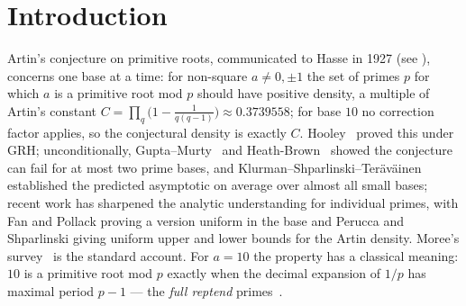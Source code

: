 \begin{abstract}
	Finally we \emph{audit the computational content} of these correlations. In a resubstitution diagnostic the consecutive-prime correlation carries $0.000009$ nats
	($1.3\times10^{-5}$ bits) of conditional-entropy reduction beyond the elementary
	joint-residue baseline, which itself carries $0.4195$ nats; both held-out comparisons are negative, bounding any usable edge at order
	$10^{-6}$ nats.
Both exclusion laws are computationally redundant: the gap law from quadratic reciprocity
	together with multiplicativity, the same-prime law from multiplicativity alone. The one genuinely usable filter --- a primitive root must be a
quadratic non-residue --- is elementary, is exactly what the observed conductor-$40$
channel expresses, and halves the factorizations of $p-1$ in a scanning search; ordering
	the small prime channels of $p-1$ before the full factorization is about $13\%$ faster
	again.
We conclude that these correlations describe arithmetic structure rather than supply
algorithms, and we state precisely what would have to change for that verdict to change.
\end{abstract}

\maketitle

\section{Introduction}
\label{sec:intro}

Artin's conjecture on primitive roots, communicated to Hasse in 1927 (see
\cite{Artin1965}), concerns one base at a time: for non-square
$a \ne 0, \pm 1$ the set of primes $p$ for which $a$ is a primitive root mod $p$
should have positive density, a multiple of Artin's constant
$C = \prod_q \bigl(1 - \tfrac{1}{q(q-1)}\bigr) \approx 0.3739558$; for base $10$ no
correction factor applies, so the conjectural density is exactly $C$. Hooley~\cite{Hooley1967}
proved this under GRH; unconditionally, Gupta--Murty~\cite{GuptaMurty1984} and
Heath-Brown~\cite{HeathBrown1986} showed the conjecture can fail for at most two prime
bases, and Klurman--Shparlinski--Ter\"av\"ainen~\cite{KlurmanShparlinskiTeravainen2025}
established the predicted asymptotic on average over almost all small bases; recent work
has sharpened the analytic understanding for individual primes, with Fan and Pollack
\cite{FanPollack2025} proving a version uniform in the base and Perucca and Shparlinski
\cite{PeruccaShparlinski2025} giving uniform upper and lower bounds for the Artin density.
Moree's survey~\cite{Moree2012} is the standard account. For $a=10$ the property has a classical
meaning: $10$ is a primitive root mod $p$ exactly when the decimal expansion of $1/p$ has
maximal period $p-1$ --- the \emph{full reptend} primes~\cite[pp.~166--171]{ConwayGuy1996}.

